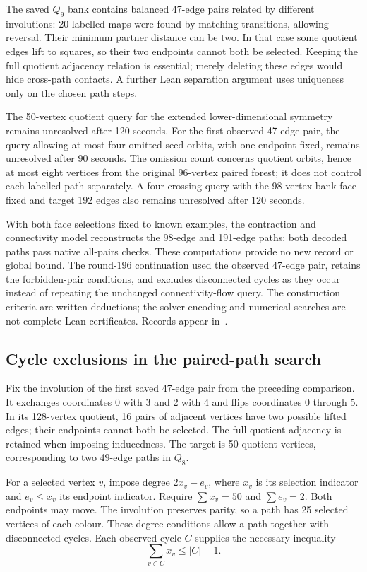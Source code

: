 \documentclass[11pt,a4paper]{article}
\theoremstyle{definition}
\theoremstyle{remark}
\begin{document}
The saved $Q_9$ bank contains balanced 47-edge pairs related by
different involutions: 20 labelled maps were found by matching
transitions, allowing reversal. Their minimum partner distance can
be two. In that case some quotient edges lift to squares, so their
two endpoints cannot both be selected. Keeping the full quotient
adjacency relation is essential; merely deleting these edges would
hide cross-path contacts. A further Lean separation argument uses
uniqueness only on the chosen path steps.

The 50-vertex quotient query for the extended lower-dimensional
symmetry remains unresolved after 120 seconds. For the first observed
47-edge pair, the query allowing at most four omitted seed orbits,
with one endpoint fixed, remains unresolved after 90 seconds.
The omission count concerns quotient orbits, hence at most eight
vertices from the original 96-vertex paired forest; it does not
control each labelled path separately. A four-crossing query with
the 98-vertex bank face fixed and target 192 edges also remains
unresolved after 120 seconds.

With both face selections fixed to known examples, the contraction
and connectivity model reconstructs the 98-edge and 191-edge paths;
both decoded paths pass native all-pairs checks. These computations
provide no new record or global bound. The round-196 continuation used the
observed 47-edge pair, retains the forbidden-pair conditions, and
excludes disconnected cycles as they occur instead of repeating
the unchanged connectivity-flow query. The construction criteria
are written deductions; the solver encoding and numerical searches
are not complete Lean certificates. Records appear
in~\cite{forests195archive}.


\subsection{Cycle exclusions in the paired-path search}
\label{sec:cycles196}

Fix the involution of the first saved 47-edge pair from the preceding
comparison. It exchanges coordinates 0 with 3 and 2 with 4 and flips
coordinates 0 through 5. In its 128-vertex quotient, 16 pairs of adjacent
vertices have two possible lifted edges; their endpoints cannot both
be selected. The full quotient adjacency is retained when imposing
inducedness. The target is 50 quotient vertices, corresponding to two
49-edge paths in $Q_8$.

For a selected vertex $v$, impose degree $2x_v-e_v$, where $x_v$ is its
selection indicator and $e_v\le x_v$ its endpoint indicator. Require
$\sum x_v=50$ and $\sum e_v=2$. Both endpoints may move. The involution
preserves parity, so a path has 25 selected vertices of each colour.
These degree conditions allow a path together with disconnected cycles.
Each observed cycle $C$ supplies the necessary inequality
\[
\sum_{v\in C}x_v\le |C|-1.
\]
\end{document}
